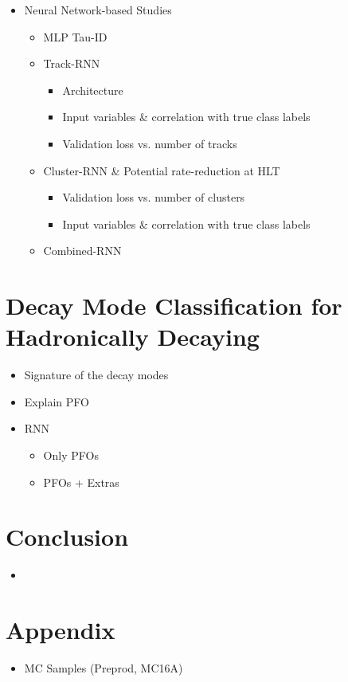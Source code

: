 \begin{itemize}
\item Neural Network-based Studies
  \begin{itemize}
  \item MLP Tau-ID
  \item Track-RNN
    \begin{itemize}
    \item Architecture
    \item Input variables \& correlation with true class labels
    \item Validation loss vs. number of tracks
    \end{itemize}
  \item Cluster-RNN \& Potential rate-reduction at HLT
    \begin{itemize}
    \item Validation loss vs. number of clusters
    \item Input variables \& correlation with true class labels
    \end{itemize}
  \item Combined-RNN
  \end{itemize}
\end{itemize}

\section{Decay Mode Classification for Hadronically Decaying}

\begin{itemize}
\item Signature of the decay modes
\item Explain PFO
\item RNN
  \begin{itemize}
  \item Only PFOs
  \item PFOs + Extras
  \end{itemize}
\end{itemize}

\section{Conclusion}

\begin{itemize}
\item
\end{itemize}

\section{Appendix}

\begin{itemize}
\item MC Samples (Preprod, MC16A)
\end{itemize}

